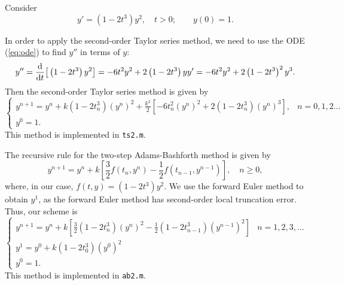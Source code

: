 \documentclass{homework}
\begin{document}
	\maketitle
	
	\question
	Consider
	\begin{equation}
		\label{eq:ode}
		y' = \left(1-2t^3\right)y^2, \quad t > 0; \qquad y(0) = 1.
	\end{equation}
	
	\begin{alphaparts}
		\questionpart In order to apply the second-order Taylor series method, we need to use the ODE (\ref{eq:ode}) to find $y''$ in terms of $y$:
		\begin{equation*}
			y'' = \frac{\text{d} {}}{\text{d} {t}}\big[\left(1-2t^3\right)y^2\big] = -6t^2y^2 + 2\left(1-2t^3\right)yy' = -6t^2y^2 + 2\left(1-2t^3\right)^2y^3.
		\end{equation*}
		Then the second-order Taylor series method is given by
		\begin{equation*}
			\begin{cases}
				y^{n+1} = y^n + k\left(1-2t_n^3\right)\left(y^n\right)^2 + \frac{k^2}{2}\left[-6t_n^2\left(y^n\right)^2 + 2\left(1-2t_n^3\right)\left(y^n\right)^3\right], & n = 0,1,2\dots \\
				y^0 = 1.
			\end{cases}
		\end{equation*}
		This method is implemented in \verb*|ts2.m|.
		
		\questionpart The recursive rule for the two-step Adams-Bashforth method is given by 
		\begin{equation*}
			y^{n+1} = y^n + k\left[\frac{3}{2}f\left(t_n, y^n\right) - \frac{1}{2}f\left(t_{n-1}, y^{n-1}\right)\right], \quad n \ge 0,
		\end{equation*}
		where, in our case, $f(t,y) = \left(1-2t^3\right)y^2$. We use the forward Euler method to obtain $y^1$, as the forward Euler method has second-order local truncation error. Thus, our scheme is
		\begin{equation*}
			\begin{cases}
				y^{n+1} = y^n + k\left[\frac{3}{2}\left(1-2t_n^3\right)\left(y^n\right)^2 - \frac{1}{2}\left(1-2t_{n-1}^3\right)\left(y^{n-1}\right)^2\right] & n = 1, 2, 3,\dots \\
				y^1 = y^0 + k\left(1-2t_0^3\right)\left(y^0\right)^2 \\
				y^0 = 1.
			\end{cases}
		\end{equation*}
		This method is implemented in \verb*|ab2.m|.
		\questionpart 
	\end{alphaparts}
	
	\question
	
\end{document}
